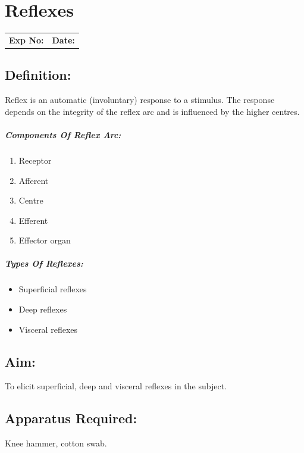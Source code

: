 \documentclass[a4paper,12pt,openany,twoside]{book}
\begin{document}
															\chapter*{\centering Reflexes}
															\begin{tabular}{p{5in} p{1in}}
																\textbf{Exp No:}  & \textbf{Date:}\\
															\end{tabular}
															\section*{Definition:}
Reflex is an automatic (involuntary) response to a stimulus. The response depends on the integrity of the reflex arc and is influenced by the higher centres.
\paragraph{Components Of Reflex Arc:}
\begin{enumerate}
\item{ Receptor}
\item{ Afferent}
\item{ Centre}
\item{ Efferent}
\item{ Effector organ}
\end{enumerate}
\paragraph{Types Of Reflexes:}
\begin{itemize}
\item{Superficial reflexes}
\item{Deep reflexes}
\item{Visceral reflexes}
\end{itemize}
\section*{Aim:} 
To elicit superficial, deep and visceral reflexes in the subject.
\section*{Apparatus Required:}
Knee hammer, cotton swab.
\end{document}
